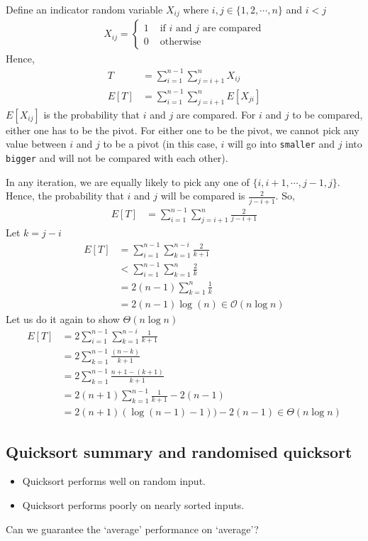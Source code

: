 \documentclass[11pt]{article}
\begin{document}
Define an indicator random variable $X_{ij}$ where $i,j \in \{1,2,\cdots, n\}$ and $i < j$
\begin{align*}
    X_{ij} = 
    \begin{cases}
    1 & \text{ if $i$ and $j$ are compared} \\
    0 & \text{ otherwise } 
    \end{cases}
\end{align*}
Hence, 
\begin{align*}
    T &= \sum_{i=1}^{n-1} \sum_{j=i+1}^n X_{ij} \\
    E[T] &= \sum_{i=1}^{n-1} \sum_{j=i+1}^n E[X_{ji}]
\end{align*}
$E[X_{ij}]$ is the probability that $i$ and $j$ are compared. For $i$ and $j$ to be compared, either one has to be the pivot. For either one to be the pivot, we cannot pick any value between $i$ and $j$ to be a pivot (in this case, $i$ will go into \texttt{smaller} and $j$ into \texttt{bigger} and will not be compared with each other). 

In any iteration, we are equally likely to pick any one of $\{i, i+1, \cdots, j-1, j\}$. Hence, the probability that $i$ and $j$ will be compared is $\frac{2}{j-i+1}$. So, 
\begin{align*}
    E[T] &= \sum_{i=1}^{n-1} \sum_{j=i+1}^n \frac{2}{j-i+1}
\end{align*}
Let $k = j-i$
\begin{align*}
    E[T] &= \sum_{i=1}^{n-1} \sum_{k=1}^{n-i} \frac{2}{k+1} \\
    &< \sum_{i=1}^{n-1} \sum_{k=1}^{n} \frac{2}{k} \\
    &= 2(n-1) \sum_{k=1}^n \frac{1}{k} \\
    &= 2(n-1) \log(n) \in \mathcal{O}(n\log n)
\end{align*}
Let us do it again to show $\Theta(n \log n)$
\begin{align*}
    E[T] &= 2\sum_{i=1}^{n-1} \sum_{k=1}^{n-i} \frac{1}{k+1} \\
    &= 2 \sum_{k=1}^{n-1} \frac{(n-k)}{k+1} \\
    &= 2 \sum_{k=1}^{n-1} \frac{n+1 - (k+1)}{k+1} \\
    &= 2 (n+1) \sum_{k=1}^{n-1} \frac{1}{k+1} - 2(n-1) \\
    &= 2(n+1) (\log(n-1) -1)) - 2(n-1) \in \Theta(n \log n)
\end{align*}
\subsection{Quicksort summary and randomised quicksort}
\begin{itemize}
    \item Quicksort performs well on random input. 
    \item Quicksort performs poorly on nearly sorted inputs.
\end{itemize}
Can we guarantee the `average' performance on `average'?
\end{document}
